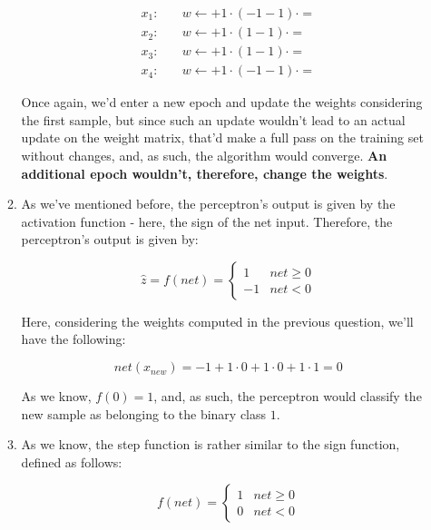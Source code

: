 \documentclass[12pt]{article}
\begin{document}
\begin{enumerate}[leftmargin=\labelsep]
\begin{enumerate}
{      \begin{align*}
        x_1: \quad & w \leftarrow  + 1 \cdot (-1 - 1) \cdot  =  \\
        x_2: \quad & w \leftarrow  + 1 \cdot (1 - 1) \cdot  =  \\
        x_3: \quad & w \leftarrow  + 1 \cdot (1 - 1) \cdot  =  \\
        x_4: \quad & w \leftarrow  + 1 \cdot (-1 - 1) \cdot  = 
      \end{align*}

      Once again, we'd enter a new epoch and update the weights considering the first sample,
      but since such an update wouldn't lead to an actual update on the weight matrix,
      that'd make a full pass on the training set without changes, and, as such,
      the algorithm would converge. \textbf{An additional epoch wouldn't, therefore,
      change the weights}.
    }
    \item {
      As we've mentioned before, the perceptron's output is given by the
      activation function - here, the sign of the net input. Therefore, the
      perceptron's output is given by:

      $$
      \hat{z} = f(net) = \begin{cases}
        1 & net \geq 0 \\
        -1 & net < 0
      \end{cases}
      $$

      Here, considering the weights computed in the previous question, we'll
      have the following:

      $$
        net(x_{new}) = -1 + 1 \cdot 0 + 1 \cdot 0 + 1 \cdot 1 = 0
      $$

      As we know, $f(0) = 1$, and, as such, the perceptron would classify the
      new sample as belonging to the binary class $1$.
    }
    \item {
      As we know, the step function is rather similar to the sign function,
      defined as follows:

      $$
        f(net) = \begin{cases}
          1 & net \geq 0 \\
          0 & net < 0
        \end{cases}
      $$

}
\end{enumerate}
\end{enumerate}
\end{document}
